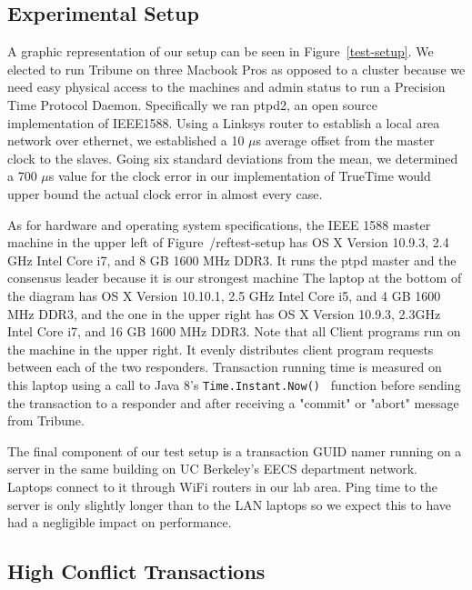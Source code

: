 \documentclass[10pt,twocolumn]{article}
\begin{document}
\subsection{Experimental Setup}

A graphic representation of our setup can be seen in Figure~\ref{test-setup}. We elected to run Tribune on three Macbook Pros as opposed to a cluster because we need easy physical access to the machines and admin status to run a Precision Time Protocol Daemon. Specifically we ran ptpd2, an open source implementation of IEEE1588. Using a Linksys router to establish a local area network over ethernet, we established a 10 $\mu$s average offset from the master clock to the slaves. Going six standard deviations from the mean, we determined a 700 $\mu$s value for the clock error in our implementation of TrueTime would upper bound the actual clock error in almost every case.

As for hardware and operating system specifications, the IEEE 1588 master machine in the upper left of Figure~/ref{test-setup} has OS X Version 10.9.3, 2.4 GHz Intel Core i7, and 8 GB 1600 MHz DDR3. It runs the ptpd master and the consensus leader because it is our strongest machine  The laptop at the bottom of the diagram has OS X Version 10.10.1, 2.5 GHz Intel Core i5, and 4 GB 1600 MHz DDR3, and the one in the upper right has OS X Version 10.9.3, 2.3GHz Intel Core i7, and 16 GB 1600 MHz DDR3. Note that all Client programs run on the machine in the upper right. It evenly distributes client program requests between each of the two responders. Transaction running time is measured on this laptop using a call to Java 8's {\tt Time.Instant.Now() } function before sending the transaction to a responder and after receiving a "commit" or "abort" message from Tribune.

The final component of our test setup is a transaction GUID namer running on a server in the same building on UC Berkeley's EECS department network. Laptops connect to it through WiFi routers in our lab area. Ping time to the server is only slightly longer than to the LAN laptops so we expect this to have had a negligible impact on performance.

\subsection{High Conflict Transactions}
\end{document}
